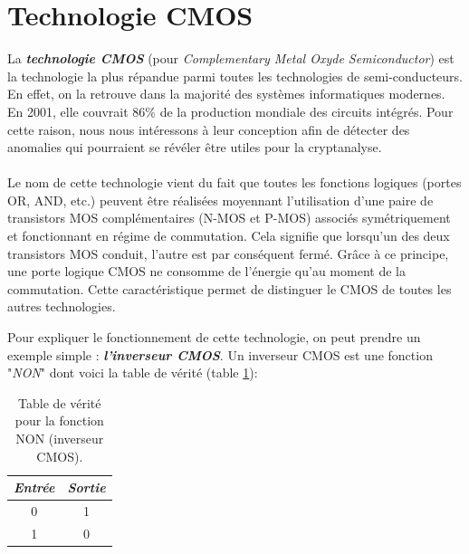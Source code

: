 \documentclass[oneside]{book}
\begin{document}
\section{Technologie CMOS}
\label{sec:CMOS}
La \textbf{\textit{technologie CMOS}} (pour \textit{Complementary Metal Oxyde Semiconductor}) est la technologie la plus répandue parmi toutes les technologies de semi-conducteurs. En effet, on la retrouve dans la majorité des systèmes informatiques modernes. En 2001, elle couvrait 86\% \cite{CMOS} de la production mondiale des circuits intégrés. Pour cette raison, nous nous intéressons à leur conception afin de détecter des anomalies qui pourraient se révéler être utiles pour la cryptanalyse. \\ \\
Le nom de cette technologie vient du fait que toutes les fonctions logiques (portes OR, AND, etc.) peuvent être réalisées moyennant l’utilisation d’une paire de transistors MOS complémentaires (N-MOS et P-MOS) associés symétriquement et fonctionnant en régime de commutation. Cela signifie que lorsqu'un des deux transistors MOS conduit, l’autre est par conséquent fermé. Grâce à ce principe, une porte logique CMOS ne consomme de l’énergie qu’au moment de la commutation. Cette caractéristique permet de distinguer le CMOS de toutes les autres technologies.

\hspace{-0.5 cm}Pour expliquer le fonctionnement de cette technologie, on peut prendre un exemple simple : \textbf{\textit{l'inverseur CMOS}}. Un inverseur CMOS est une fonction "\textit{NON}" dont voici la table de vérité (table \ref{tab:verite}):
\begin{table}[htbp]
	\centering
	\begin{tabular}{|c|c|}
    		\hline
   		  \textit{Entrée} & \textit{Sortie} \\ \hline 
   		  0 & 1 \\ 
   		  1 & 0 \\ \hline
	\end{tabular}
    	\caption{Table de vérité pour la fonction NON (inverseur CMOS).}
    	\label{tab:verite} 
\end{table}

\newpage
\end{document}
